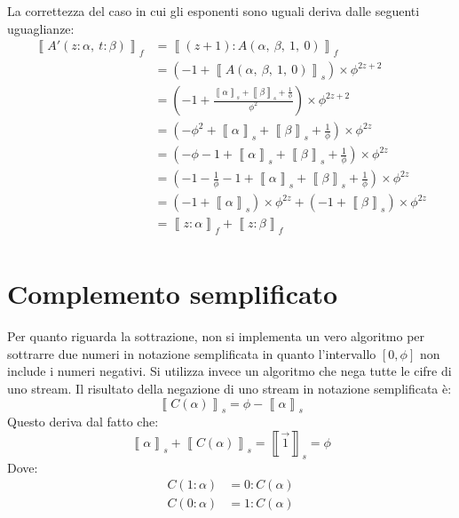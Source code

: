 \documentclass[Lau,oneside]{sapthesis}
\begin{document}
La correttezza del caso in cui gli esponenti sono uguali deriva dalle seguenti uguaglianze:
\begin{align*}
\left\llbracket A'(z:\alpha, \ t:\beta) \right\rrbracket_f & = \left\llbracket (z+1):A(\alpha, \ \beta, \ 1, \ 0) \right\rrbracket_f\\
& = \left( -1 + \left\llbracket A(\alpha, \ \beta, \ 1, \ 0) \right\rrbracket_s \right) \times \phi^{2z+2}\\
& = \left( -1 + \frac{ \left\llbracket \alpha \right\rrbracket_s + \left\llbracket \beta \right\rrbracket_s + \frac{1}{\phi}}{\phi^2} \right) \times \phi^{2z+2}\\
& = \left( -\phi^2 + \left\llbracket \alpha \right\rrbracket_s + \left\llbracket \beta \right\rrbracket_s + \frac{1}{\phi} \right) \times \phi^{2z}\\
& = \left( -\phi -1 + \left\llbracket \alpha \right\rrbracket_s + \left\llbracket \beta \right\rrbracket_s + \frac{1}{\phi} \right) \times \phi^{2z}\\
& = \left( -1 -\frac{1}{\phi} -1 + \left\llbracket \alpha \right\rrbracket_s + \left\llbracket \beta \right\rrbracket_s + \frac{1}{\phi} \right) \times \phi^{2z}\\
& = \left( -1 + \left\llbracket \alpha \right\rrbracket_s \right) \times \phi^{2z} + \left( -1 + \left\llbracket \beta \right\rrbracket_s \right) \times \phi^{2z}\\
& = \left\llbracket z:\alpha \right\rrbracket_f + \left\llbracket z:\beta \right\rrbracket_f\\
\end{align*}


\section{Complemento semplificato}
Per quanto riguarda la sottrazione, non si implementa un vero algoritmo per sottrarre due numeri in notazione semplificata in quanto l'intervallo $\left[0,\phi\right]$ non include i numeri negativi. Si utilizza invece un algoritmo che nega tutte le cifre di uno stream. Il risultato della negazione di uno stream in notazione semplificata è:
$$\left\llbracket C(\alpha) \right\rrbracket_s = \phi - \left\llbracket \alpha \right\rrbracket_s$$
Questo deriva dal fatto che:
$$\left\llbracket \alpha \right\rrbracket_s + \left\llbracket C(\alpha) \right\rrbracket_s = \left\llbracket \overrightarrow{1} \right\rrbracket_s = \phi$$
Dove:
\begin{align*}
C(1:\alpha) & = 0:C(\alpha)\\
C(0:\alpha) & = 1:C(\alpha)\\
\end{align*}
\end{document}
